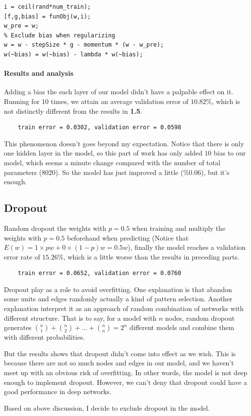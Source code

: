 \documentclass{article}
\begin{document}
\begin{lstlisting}
i = ceil(rand*num_train);
[f,g,bias] = funObj(w,i);
w_pre = w;
% Exclude bias when regularizing
w = w - stepSize * g - momentum * (w - w_pre);
w(~bias) = w(~bias) - lambda * w(~bias);
\end{lstlisting}

\paragraph{Results and analysis}
Adding a bias the each layer of our model didn't have a palpable effect on it. Running for 10 times, we attain an average validation error of $10.82\%$, which is not distinctly different from the results in \textbf{1.5}.\par

\begin{commandline}
	\begin{verbatim}
	train error = 0.0302, validation error = 0.0598
	\end{verbatim}
\end{commandline}

This phenomenon doesn't goes beyond my expectation. Notice that there is only one hidden layer in the model, so this part of work has only added $10$ bias to our model, which seems a minute change compared with the number of total parameters ($8020$). So the model has just improved a little ($\%0.06$), but it's enough.

\subsection{Dropout}

Random dropout the weights with $p=0.5$ when training and multiply the weights with $p=0.5$ beforehand when predicting (Notice that $E(w)=1\times pw+0\times (1-p)w=0.5w$), finally the model reaches a validation error rate of $15.26\%$, which is a little worse than the results in preceding parts.

\begin{commandline}
	\begin{verbatim}
	train error = 0.0652, validation error = 0.0760
	\end{verbatim}
\end{commandline}

Dropout play as a role to avoid overfitting. One explanation is that abandon some units and edges randomly actually a kind of pattern selection. Another explanation interpret it as an approach of random combination of networks with different structure. That is to say, for a model with $n$ nodes, random dropout generates $\binom{n}{1}+\binom{n}{2}+\dots+\binom{n}{n}=2^n$ different models and combine them with different probabilities.\par
But the results shows that dropout didn't come into effect as we wish. This is because there are not so much nodes and edges in our model, and we haven't meet up with an obvious risk of overfitting. In other words, the model is not deep enough to implement dropout. However, we can't deny that dropout could have a good performance in deep networks.\par
Based on above discussion, I decide to exclude dropout in the model.
\end{document}
